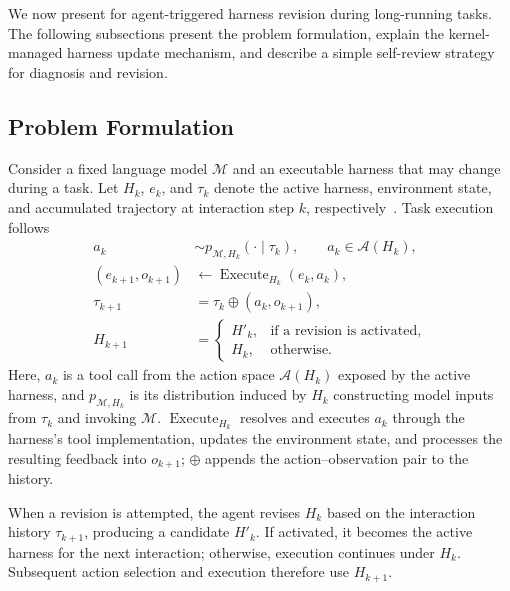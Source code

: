 \section{\boxbox{}}
\label{sec:boxbox}

We now present \boxbox{} for agent-triggered harness revision during long-running tasks. The following subsections present the problem formulation, explain the kernel-managed harness update mechanism, and describe a simple self-review strategy for diagnosis and revision.

\subsection{Problem Formulation}
\label{sec:boxbox-formulation}

Consider a fixed language model $\mathcal{M}$ and an executable harness that may change during a task. Let $H_k$, $e_k$, and $\tau_k$ denote the active harness, environment state, and accumulated trajectory at interaction step $k$, respectively~\citep{yao2023react}. Task execution follows
%
\begin{equation}
  \begin{aligned}
    a_k &\sim p_{\mathcal{M},H_k}(\cdot\mid\tau_k),
    \qquad a_k\in\mathcal{A}(H_k),\\
    (e_{k+1},o_{k+1}) &\leftarrow \operatorname{Execute}_{H_k}(e_k,a_k),\\
    \tau_{k+1} &= \tau_k\oplus(a_k,o_{k+1}),\\
    H_{k+1} &=
    \begin{cases}
      H'_k, & \text{if a revision is activated},\\
      H_k, & \text{otherwise}.
    \end{cases}
  \end{aligned}
  \label{eq:boxbox-interaction}
\end{equation}
%
Here, $a_k$ is a tool call from the action space $\mathcal{A}(H_k)$ exposed by the active harness, and $p_{\mathcal{M},H_k}$ is its distribution induced by $H_k$ constructing model inputs from $\tau_k$ and invoking $\mathcal{M}$. $\operatorname{Execute}_{H_k}$ resolves and executes $a_k$ through the harness's tool implementation, updates the environment state, and processes the resulting feedback into $o_{k+1}$; $\oplus$ appends the action--observation pair to the history.

When a revision is attempted, the agent revises $H_k$ based on the interaction history $\tau_{k+1}$, producing a candidate $H'_k$. If activated, it becomes the active harness for the next interaction; otherwise, execution continues under $H_k$. Subsequent action selection and execution therefore use $H_{k+1}$.

